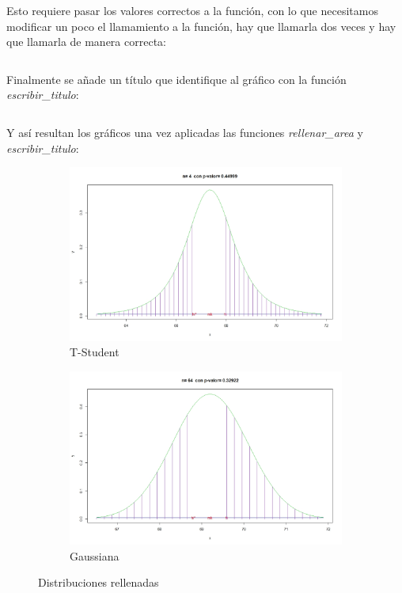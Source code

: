 \inputminted[firstline=55, lastline=85]{R}{../R/dependencias.R}

Esto requiere pasar los valores correctos a la función, con lo que necesitamos modificar un poco el llamamiento a la función, hay que llamarla dos veces y hay que llamarla de manera correcta:

\inputminted[autogobble, firstline=48, lastline=54]{R}{../R/media.R}

Finalmente se añade un título que identifique al gráfico con la función \textit{escribir\_titulo}:

\inputminted[firstline=49, lastline=52]{R}{../R/dependencias.R}

Y así resultan los gráficos una vez aplicadas las funciones \textit{rellenar\_area} y \textit{escribir\_titulo}:

\begin{figure}[h]
	\begin{subfigure}{0.5\textwidth}
		\includegraphics[width=\linewidth]{assets/grafico-completo-student.jpeg}
		\caption{T-Student}
		\label{fig:subim3}
	\end{subfigure}
	\begin{subfigure}{0.5\textwidth}
		\includegraphics[width=\linewidth]{assets/grafico-completo-normal.jpeg}
		\caption{Gaussiana}
		\label{fig:subim4}
	\end{subfigure}
	\caption{Distribuciones rellenadas}
	\label{fig:image2}
\end{figure}

